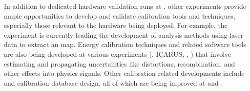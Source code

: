 
In addition to dedicated hardware validation runs at , other  experiments provide ample opportunities to develop and validate calibration tools and techniques, especially those relevant to the hardware being deployed. For example, the  experiment is currently leading the development of analysis methods using laser data to extract an \efield map. Energy calibration techniques and related software tools are also being developed at various experiments (, ICARUS, , ) that involve estimating and propagating uncertainties like \efield distortions, recombination, and other effects into physics signals. Other calibration related developments include  and calibration database design, all of which are being improved at  and .
 

